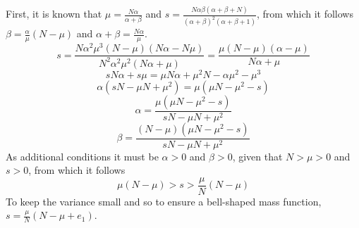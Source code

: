 \documentclass[a4paper, headings=standardclasses]{scrartcl}
\begin{document}
First, it is known that $\mu = \frac{N \alpha}{\alpha + \beta}$  and $s=\frac{N\alpha\beta(\alpha + \beta + N)}{(\alpha+\beta)^2(\alpha+\beta+1)}$, from which it follows $\beta = \frac{\alpha}{\mu}(N-\mu)$ and $\alpha + \beta = \frac{N \alpha}{\mu}$.
$$s=\frac{N\alpha^2\mu^3(N-\mu)(N\alpha-N\mu)}{N^2\alpha^2\mu^2(N\alpha+\mu)} = \frac{\mu(N-\mu)(\alpha-\mu)}{N\alpha+\mu}$$
$$sN\alpha + s\mu = \mu N\alpha + \mu^2 N - \alpha \mu^2 - \mu^3$$
$$\alpha(sN -\mu N + \mu^2) = \mu(\mu N - \mu^2 -s)$$
$$\alpha=\frac{\mu(\mu N - \mu^2 -s)}{sN -\mu N + \mu^2}$$
$$\beta=\frac{(N-\mu)(\mu N - \mu^2 -s)}{sN -\mu N + \mu^2}$$
As additional conditions it must be $\alpha > 0$ and $\beta>0$, given that $N>\mu>0$ and $s>0$, from which it follows
$$\mu(N-\mu) > s > \frac{\mu}{N}(N-\mu)$$
To keep the variance small and so to ensure a bell-shaped mass function, $s=\frac{\mu}{N}(N-\mu+e_1)$.
\end{document}
